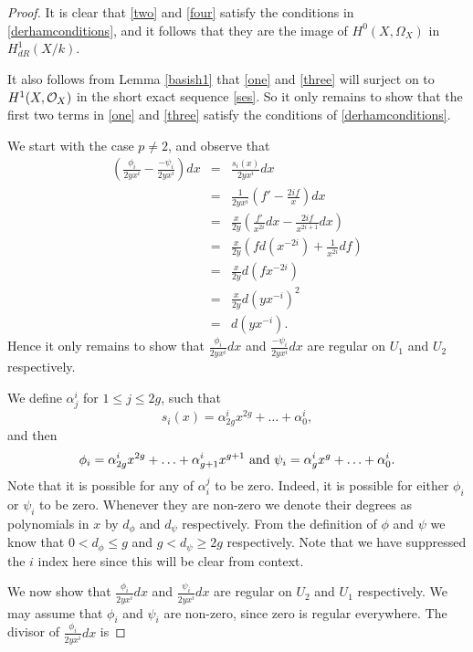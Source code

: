 \documentclass[draft, 11pt]{article} %
\theoremstyle{plain}
\theoremstyle{remark}
\newcommand{\cO}{{\cal O}}
\begin{document}
{\begin{proof}
It is clear that \eqref{two} and \eqref{four} satisfy the conditions in \eqref{derhamconditions}, and it follows \cite[Thm 6.1]{faithfulaction} that they are the image of $H^0(X,\Omega_X)$ in $H^1_{dR}(X/k)$.

It also follows from Lemma \ref{basish1} that \eqref{one} and \eqref{three} will surject on to $H^1(X,\cO_X)$ in the short exact sequence \eqref{ses}. 
So it only remains to show that the first two terms in \eqref{one} and \eqref{three} satisfy the conditions of \eqref{derhamconditions}.


We start with the case $p\neq 2$, and observe that
\begin{eqnarray*}
\left( \frac{\phi_i}{2yx^i} - \frac{-\psi_i}{2yx^i} \right) dx & = & \frac{s_i(x)}{2yx^i} dx \\
& = & \frac{1}{2yx^i} \left( f' - \frac{2if}{x} \right) dx \\
& = & \frac{x}{2y} \left( \frac{f'}{x^{2i}}dx -\frac{2if}{x^{2i+1}} dx \right) \\
& = & \frac{x}{2y} \left( fd(x^{-2i}) + \frac{1}{x^{2i}}df \right) \\
& = & \frac{x}{2y}d(fx^{-2i}) \\
& = & \frac{x}{2y} d(yx^{-i})^2 \\
& = & d(yx^{-i}).
\end{eqnarray*}
Hence it only remains to show that $\frac{\phi_i}{2yx^i}dx$ and $\frac{-\psi_i}{2yx^i}dx$ are regular on $U_1$ and $U_2$ respectively.



We define $\alpha^i_j$ for $1\leq j \leq 2g$, such that
\[
s_i(x) = \alpha^i_{2g}x^{2g} + \ldots + \alpha^i_0,
\]
and then
\[
\phi_i = \alpha^i_{2g}x^{2g} + \ldots + \alpha^i_{g+1}x^{g+1} \ {\rm and } \ \psi_i = \alpha^i_gx^g + \ldots + \alpha^i_0.
\]
Note that it is possible for any of $\alpha_i^j$ to be zero. Indeed, it is possible for either $\phi_i$ or $\psi_i$ to be zero.
Whenever they are non-zero we denote their degrees as polynomials in $x$ by $d_\phi$ and $d_\psi$ respectively. From the definition of $\phi$ and $\psi$ we know that $0 < d_\phi \leq g$ and $g < d_\psi \geq 2g$ respectively.
Note that we have suppressed the $i$ index here since this will be clear from context.


We now show that $\frac{\phi_i}{2yx^i}dx$ and $\frac{\psi_i}{2yx^i}dx$ are regular on $U_2$ and $U_1$ respectively.
We may assume that $\phi_i$ and $\psi_i$ are non-zero, since zero is regular everywhere.
The divisor of $\frac{\phi_i}{2yx^i}dx$ is


\end{proof}}
\end{document}
